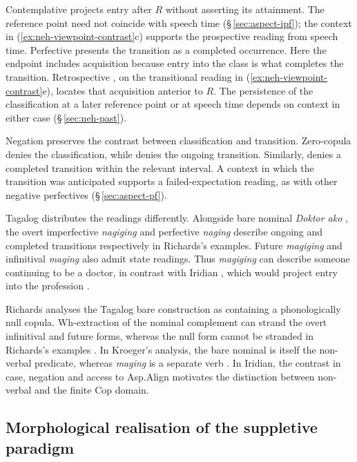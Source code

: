 Contemplative  projects entry after $R$ without asserting
its attainment. The reference point need not coincide with speech
time (§\,\ref{sec:aspect-ipf}); the context in
(\ref{ex:neh-viewpoint-contrast}c) supports the prospective reading from
speech time. Perfective  presents the transition as a completed
occurrence. Here the endpoint includes acquisition because entry into
the class is what completes the transition. Retrospective
, on the transitional reading in
(\ref{ex:neh-viewpoint-contrast}e), locates that acquisition anterior
to $R$. The persistence of the classification at a later reference
point or at speech time depends on context in either case
(§\,\ref{sec:neh-past}).

Negation preserves the contrast between classification and transition.
Zero-copula  
denies the classification, while 
 denies the ongoing transition.
Similarly,  
denies a completed transition within the relevant interval. A context
in which the transition was anticipated supports a failed-expectation
reading, as with other negative perfectives (§\,\ref{sec:aspect-pf}).

Tagalog distributes the readings differently. Alongside bare nominal
\textit{Doktor ako} , the overt imperfective
\textit{nagiging} and perfective \textit{naging} describe ongoing and
completed transitions respectively in Richards's examples. Future
\textit{magiging} and infinitival \textit{maging} also admit state
readings. Thus \textit{magiging} can describe someone continuing to be
a doctor, in contrast with Iridian , which would project entry
into the profession \cite[184--185]{richards2009tagalog}.

Richards analyses the Tagalog bare construction as containing a
phonologically null copula. Wh-extraction of the nominal complement
can strand the overt infinitival and future forms, whereas the null
form cannot be stranded in Richards's examples
\cite[§2.4]{richards2009tagalog}. In Kroeger's analysis, the bare
nominal is itself the non-verbal predicate, whereas \textit{maging}
is a separate verb \cite[178--179]{kroeger2005}. In Iridian, the
contrast in case, negation and access to Asp.Align motivates the
distinction between non-verbal  and the finite Cop domain.

\subsection{Morphological realisation of the suppletive paradigm}

